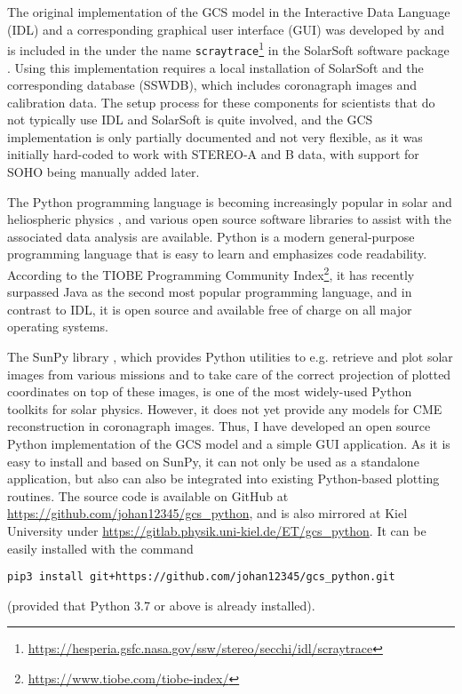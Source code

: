The original implementation of the GCS model in the Interactive Data Language (IDL) and a corresponding graphical user interface (GUI) was developed by \citet{Thernisien-2006-GCS} and is included in the under the name \texttt{scraytrace}\footnote{\url{https://hesperia.gsfc.nasa.gov/ssw/stereo/secchi/idl/scraytrace}} in the SolarSoft software package \citep{Freeland-1998-SolarSoft}. Using this implementation requires a local installation of SolarSoft and the corresponding database (SSWDB), which includes coronagraph images and calibration data. The setup process for these components for scientists that do not typically use IDL and SolarSoft is quite involved, and the GCS implementation is only partially documented and not very flexible, as it was initially hard-coded to work with STEREO-A and B data, with support for SOHO being manually added later.

The Python programming language is becoming increasingly popular in solar and heliospheric physics \citep[e.g.]{Burrell-2018}, and various open source software libraries to assist with the associated data analysis are available. Python is a modern general-purpose programming language that is easy to learn and emphasizes code readability. According to the TIOBE Programming Community Index\footnote{\url{https://www.tiobe.com/tiobe-index/}}, it has recently surpassed Java as the second most popular programming language, and in contrast to IDL, it is open source and available free of charge on all major operating systems.

The SunPy library \citep{sunpy_community2020}, which provides Python utilities to e.g. retrieve and plot solar images from various missions and to take care of the correct projection of plotted coordinates on top of these images, is one of the most widely-used Python toolkits for solar physics. However, it does not yet provide any models for CME reconstruction in coronagraph images.
Thus, I have developed an open source Python implementation of the GCS model and a simple GUI application. As it is easy to install and based on SunPy, it can not only be used as a standalone application, but also can also be integrated into existing Python-based plotting routines. The source code is available on GitHub at \url{https://github.com/johan12345/gcs_python}, and is also mirrored at Kiel University under \url{https://gitlab.physik.uni-kiel.de/ET/gcs_python}. It can be easily installed with the command
\begin{verbatim}
pip3 install git+https://github.com/johan12345/gcs_python.git
\end{verbatim}
(provided that Python 3.7 or above is already installed).


